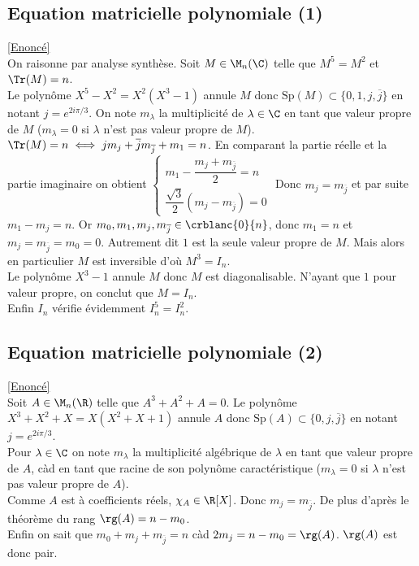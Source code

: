 \documentclass[8pt]{book}
\begin{document}
	\subsection{Equation matricielle polynomiale (1) }
	\label{Equation matricielle polynomiale (1) corrigé}
	\textcolor{blue}{\hyperref[Equation matricielle polynomiale (1)]{[Enoncé]}}\\
	On raisonne par analyse synthèse. Soit $M\in \M_n(\C)$ telle que $M^5=M^2$ et $\Tr(M)=n$.\\
	Le polynôme $X^5-X^2=X^2(X^3-1)$ annule $M$ donc $\text{Sp}(M)\subset\{0,1,j,\overline j\}$ en notant $j=e^{2i\pi/3}$. On note $m_\lambda$ la multiplicité de $\lambda\in \C$ en tant que valeur propre de $M$ ($m_\lambda=0$ si $\lambda$ n'est pas valeur propre de $M$).\\
	$\Tr(M)=n\iff jm_j+\overline jm_{\overline j}+m_1=n$. En comparant la partie réelle et la partie imaginaire on obtient $\begin{cases}
		m_1-\dfrac{m_j+m_{\overline j}}{2}=n\\
		\dfrac{\sqrt 3}{2}(m_j-m_{\overline j})=0
	\end{cases}$ Donc $m_j=m_{\overline j}$ et par suite $m_1-m_j=n$. Or $m_0,m_1,m_j,m_{\overline{j}}\in\crblanc{0}{n}$, donc $m_1=n$ et $m_j=m_{\overline j}=m_0=0$. Autrement dit $1$ est la seule valeur propre de $M$. Mais alors en particulier $M$ est inversible d'où $M^3=I_n$.\\
	Le polynôme $X^3-1$ annule $M$ donc $M$ est diagonalisable. N'ayant que $1$ pour valeur propre, on conclut que $M=I_n$.\\
	Enfin $I_n$ vérifie évidemment $I_n^5=I_n^2$.
	
	\subsection{Equation matricielle polynomiale (2) }
	\label{Equation matricielle polynomiale (2) corrigé}
	\textcolor{blue}{\hyperref[Equation matricielle polynomiale (2)]{[Enoncé]}}\\
	Soit $A\in \M_n(\R)$ telle que $A^3+A^2+A=0$. Le polynôme $X^3+X^2+X=X(X^2+X+1)$ annule $A$ donc $\text{Sp}(A)\subset\{0,j,\overline j\}$ en notant $j=e^{2i\pi/3}$.\\
	Pour $\lambda\in \C$ on note $m_\lambda$ la multiplicité algébrique de $\lambda$ en tant que valeur propre de $A$, càd en tant que racine de son polynôme caractéristique ($m_\lambda=0$ si $\lambda$ n'est pas valeur propre de $A$).\\
	Comme $A$ est à coefficients réels, $\chi_A\in \R[X]$. Donc $m_j=m_{\overline j}$. De plus d'après le théorème du rang $\rg(A)=n-m_0$.\\
	Enfin on sait que $m_0+m_j+m_{\overline j}=n$ càd $2m_j=n-m_0=\rg(A)$. $\rg(A)$ est donc pair.
	
\end{document}

